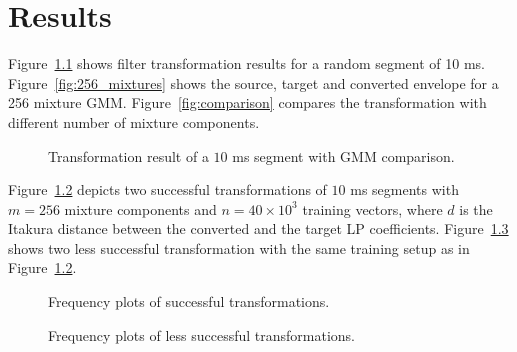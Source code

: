 \chapter{Results} %
\label{cha:results}
Figure~\ref{fig:frequency_plots_1} shows filter transformation results for a random segment of 10 ms. Figure~\ref{fig:256_mixtures} shows the source, target and converted envelope for a 256 mixture GMM. Figure~\ref{fig:comparison} compares the transformation with different number of mixture components.
\begin{figure}[htbp]
	\begin{center}
	\caption{Transformation result of a $10$ ms segment with GMM comparison.}
	\label{fig:frequency_plots_1}
	\end{center}
\end{figure}

Figure~\ref{fig:frequency_plots_2} depicts two successful transformations of $10$ ms segments with $m=256$ mixture components and $n=40\times 10^3$ training vectors, where $d$ is the Itakura distance between the converted and the target LP coefficients. Figure~\ref{fig:frequency_plots_3} shows two less successful transformation with the same training setup as in Figure~\ref{fig:frequency_plots_2}.
\begin{figure}[htbp]
	\begin{center}
	\caption{Frequency plots of successful transformations.}
	\label{fig:frequency_plots_2}
	\end{center}
\end{figure}
\begin{figure}[htbp]
	\begin{center}
	\caption{Frequency plots of less successful transformations.}
	\label{fig:frequency_plots_3}
	\end{center}
\end{figure}



